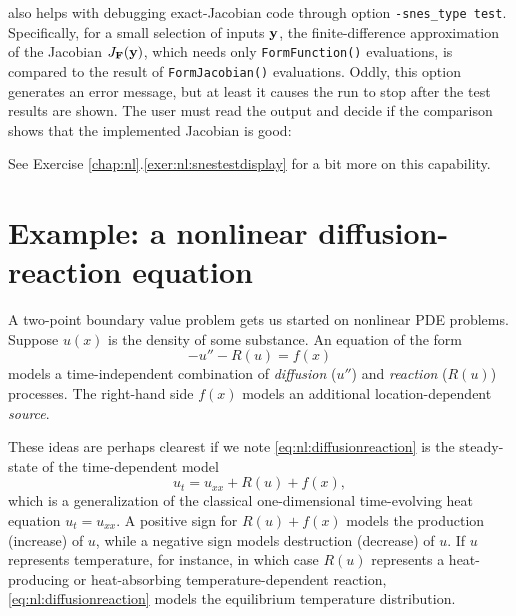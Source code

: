 \PETSc also helps with debugging exact-Jacobian code through option \texttt{-snes\_type test}.  Specifically, for a small selection of inputs $\mathbf{y}$, the finite-difference approximation of the Jacobian $J_{\mathbf{F}}(\mathbf{y})$, which needs only \texttt{FormFunction()} evaluations, is compared to the result of \texttt{FormJacobian()} evaluations.  Oddly, this option generates an error message, but at least it causes the run to stop after the test results are shown.  The user must read the output and decide if the comparison shows that the implemented Jacobian is good:
See Exercise \ref{chap:nl}.\ref{exer:nl:snestestdisplay} for a bit more on this capability.


\section{Example: a nonlinear diffusion-reaction equation}

A two-point boundary value problem gets us started on nonlinear PDE problems.  Suppose $u(x)$ is the density of some substance.  An equation of the form
\begin{equation}
- u'' - R(u) = f(x)  \label{eq:nl:diffusionreaction}
\end{equation}
models a time-independent combination of \emph{diffusion} ($u''$) and \emph{reaction} ($R(u)$) processes.  The right-hand side $f(x)$ models an additional location-dependent \emph{source}.

These ideas are perhaps clearest if we note \eqref{eq:nl:diffusionreaction} is the steady-state of the time-dependent model
\begin{equation}
u_t = u_{xx} + R(u) + f(x),  \label{eq:nl:drtimedependent}
\end{equation}
which is a generalization of the classical one-dimensional time-evolving heat equation $u_t = u_{xx}$.  A positive sign for $R(u)+f(x)$ models the production (increase) of $u$, while a negative sign models destruction (decrease) of $u$.  If $u$ represents temperature, for instance, in which case $R(u)$ represents a heat-producing or heat-absorbing temperature-dependent reaction, \eqref{eq:nl:diffusionreaction} models the equilibrium temperature distribution.

